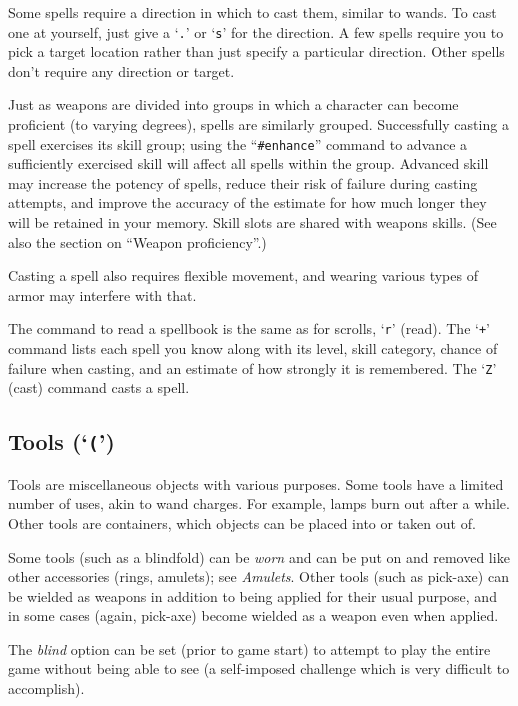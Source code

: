 \documentclass[titlepage]{article}
\begin{document}
Some spells require a direction in which to cast them, similar to wands.
To cast one at yourself, just give a `\texttt{.}' or `\texttt{s}' for the direction.
A few spells require you to pick a target location rather than just specify
a particular direction.
Other spells don't require any direction or target.

Just as weapons are divided into groups in which a character can become
proficient (to varying degrees), spells are similarly grouped.
Successfully casting a spell exercises its skill group; using the
``\texttt{\#enhance}'' command to advance a sufficiently exercised skill
will affect all spells within the group.  Advanced skill may increase the
potency of spells, reduce their risk of failure during casting attempts,
and improve the accuracy of the estimate for how much longer they will
be retained in your memory.
Skill slots are shared with weapons skills.  (See also the section on
``Weapon proficiency''.)

Casting a spell also requires flexible movement, and wearing various types
of armor may interfere with that.

The command to read a spellbook is the same as for scrolls, `\texttt{r}' (read).
The `\texttt{+}' command lists each spell you know along with its level, skill
category, chance of failure when casting, and an estimate of how strongly
it is remembered.
The `\texttt{Z}' (cast) command casts a spell.

\subsection*{Tools (`\texttt{(}')}

Tools are miscellaneous objects with various purposes.  Some tools
have a limited number of uses, akin to wand charges.  For example, lamps burn
out after a while.  Other tools are containers, which objects can
be placed into or taken out of.

Some tools (such as a blindfold) can be \textit{worn} and can be put on and
removed like other accessories (rings, amulets); see \textit{Amulets}.
Other tools (such as pick-axe) can be wielded as weapons in addition to
being applied for their usual purpose, and in some cases (again, pick-axe)
become wielded as a weapon even when applied.

The \textit{blind}
option can be set (prior to game start) to attempt to play the entire
game without being able to see (a self-imposed challenge which is
very difficult to accomplish).
\end{document}
